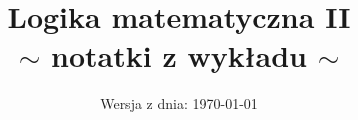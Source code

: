 \documentclass{article}
\title{\textbf{Logika matematyczna II} \\ \Large{$\sim$ notatki z wykładu $\sim$}}
\date{\small{Wersja z dnia: \today}}
\begin{document}
\maketitle

\newcommand{\N}{\mathbb{N}}
\newcommand{\Z}{\mathbb{Z}}
\newcommand{\Q}{\mathbb{Q}}
\newcommand{\R}{\mathbb{R}}
\newcommand{\A}{\mathbb{A}}
\newcommand{\B}{\mathbb{B}}
\newcommand{\C}{\mathbb{C}}
\newcommand{\D}{\mathbb{D}}
\newcommand{\E}{\mathbb{E}}
\newcommand{\F}{\mathbb{F}}
\newcommand{\K}{\mathbb{K}}

\newcommand{\X}{\mathcal{X}}
\newcommand{\Y}{\mathcal{Y}}

\newcommand{\id}{\text{id}}

\newtheorem{thm}{Thm}[section]
\theoremstyle{plain}
\newtheorem{tw}[thm]{Twierdzenie}
\newtheorem{stw}[thm]{Stwierdzenie}
\newtheorem{wn}[thm]{Wniosek}
\newtheorem{wnn}[thm]{Wnioski}
\newtheorem{lem}[thm]{Lemat}
\newtheorem{teza}[thm]{Teza}
\newtheorem{fakt}[thm]{Fakt}
\newtheorem{uw}[thm]{Uwaga}
\newtheorem{obs}[thm]{Obserwacja}

\theoremstyle{definition}
\newtheorem{df}[thm]{Definicja}
\newtheorem{oznn}[thm]{Oznaczenia}
\newtheorem{ozn}[thm]{Oznaczenie}

\theoremstyle{remark}
\newtheorem{prz}[thm]{Przykład}
\newtheorem{przyp}[thm]{Przypomnienie}
\newtheorem{zd}{Zadanie}


\newcommand{\PA}{\mathsf{P \mkern-1.9mu A}}
\newcommand{\ZFC}{\mathsf{Z \mkern-1.6mu F \mkern-1.5mu C}}
\newcommand{\DLO}{\mathsf{D \mkern-1.5mu L \mkern-1.8mu O}}
\newcommand{\ACF}{\mathsf{A \mkern-2.0mu C \mkern-1.1mu F}}
\newcommand{\RCF}{\mathsf{R \mkern-1.7mu C \mkern-1.4mu F}}
\newcommand{\FO}{\mathsf{F \mkern-1.4mu O}}
\newcommand{\q}{\mathsf{Q}}

\newcommand{\wtw}{wtedy i tylko wtedy, gdy }
\newcommand{\fae}{następujące warunki są równoważne: }
\newcommand{\Fae}{Następujące warunki są równoważne: }

\newcommand{\Th}{\text{Th}}
\newcommand{\tp}{\text{tp}}
\newcommand{\Diag}{\text{Diag}}
\newcommand{\DiagEl}{\text{Diag}_{\text{el}}}
\end{document}
